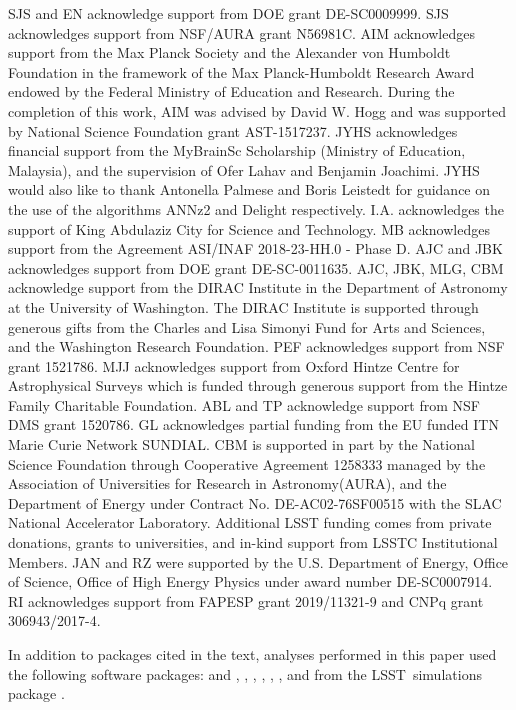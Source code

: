 \documentclass[\docopts]{\docclass}
\newcommand{\proj}[1]{\textsc{#1}}
\newcommand{\lsst}{\proj{LSST}}
\begin{document}
SJS and EN acknowledge support from DOE grant DE-SC0009999.  SJS acknowledges support from NSF/AURA grant N56981C.
AIM acknowledges support from the Max Planck Society and the Alexander von Humboldt Foundation in the framework of the Max Planck-Humboldt Research Award endowed by the Federal Ministry of Education and Research.
During the completion of this work, AIM was advised by David W. Hogg and was supported by National Science Foundation grant AST-1517237.
JYHS acknowledges financial support from the MyBrainSc Scholarship (Ministry of Education, Malaysia), and the supervision of Ofer Lahav and Benjamin Joachimi.
JYHS would also like to thank Antonella Palmese and Boris Leistedt for guidance on the use of the algorithms ANNz2 and Delight respectively.
I.A. acknowledges the support of King Abdulaziz City for Science and Technology.
MB acknowledges support from the Agreement ASI/INAF 2018-23-HH.0 - Phase D.
AJC and JBK acknowledges support from DOE grant DE-SC-0011635. AJC, JBK, MLG, CBM acknowledge support from the DIRAC Institute in the Department of Astronomy at the University of Washington. The DIRAC Institute is supported through generous gifts from the Charles and Lisa Simonyi Fund for Arts and Sciences, and the Washington Research Foundation.
PEF acknowledges support from NSF grant 1521786.
MJJ acknowledges support from Oxford Hintze Centre for Astrophysical Surveys which is funded through generous support from the Hintze Family Charitable Foundation.
ABL and TP acknowledge support from NSF DMS grant 1520786.
GL acknowledges partial funding from the EU funded ITN Marie Curie Network SUNDIAL.
CBM is supported in part by the National Science Foundation through Cooperative Agreement 1258333 managed by the Association of Universities for Research in Astronomy(AURA), and the Department of Energy under Contract No. DE-AC02-76SF00515 with the SLAC National Accelerator Laboratory. Additional LSST funding comes from private donations, grants to universities, and in-kind support from LSSTC Institutional Members.
JAN and RZ were supported by the U.S. Department of Energy, Office of Science, Office of High Energy Physics under award number DE-SC0007914.
RI acknowledges support from FAPESP grant 2019/11321-9 and CNPq grant 306943/2017-4.

In addition to packages cited in the text, analyses performed in this paper used the following software packages:  and  \citep{numpyscipy},  \citep{matplotlib},  \citep{seaborn},  \citep{minfunc},  \citep{Malz:qp, Malz:2018},  \citep{pyskynet}, and  from the \lsst\ simulations package \citep{lsstphotutils}.





\end{document}
